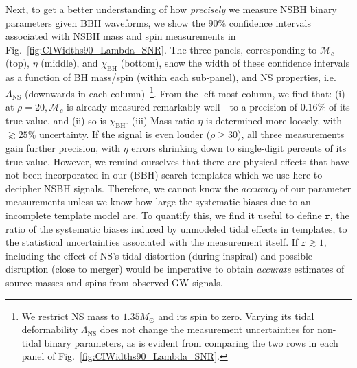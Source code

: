 \documentclass[aps,prd,amsmath,floats,floatfix, twocolumn,
superscriptaddress,nofootinbib,showpacs]{revtex4-1}
\newcommand{\lambdans}{\Lambda_\mathrm{NS}}
\newcommand{\chibh}{\chi_\mathrm{BH}}
\newcommand{\mchirp}{\mathcal{M}_c}
\newcommand{\arr}{\mathtt{r}}
\begin{document}
Next, to get a better understanding of how {\it precisely} we measure NSBH
binary parameters given BBH waveforms, we show the $90\%$ confidence intervals
associated with NSBH mass and spin measurements in Fig.~\ref{fig:CIWidths90_Lambda_SNR}.
The three panels, corresponding to $\mchirp$ (top), $\eta$ (middle), and $\chibh$
(bottom), show the width of these confidence intervals as a function of BH
mass/spin (within each sub-panel), and NS properties, i.e. $\lambdans$
(downwards in each column)~\footnote{We restrict NS mass to $1.35M_\odot$ and
its spin to zero. Varying its tidal deformability $\lambdans$ does not change
the measurement uncertainties for non-tidal binary parameters, as is evident
from comparing the two rows in each panel of Fig.~\ref{fig:CIWidths90_Lambda_SNR}.}.
% 
From the left-most column, we find that: (i) at $\rho=20, \mchirp$ is already
measured remarkably well - to a precision of $0.16\%$ of its true value, and
(ii) so is $\chibh$. (iii) Mass ratio $\eta$ is determined more loosely,
with $\gtrsim 25\%$ uncertainty. If the signal is even louder ($\rho\geq 30$),
all three measurements gain further precision, with $\eta$ errors shrinking down
to single-digit percents of its true value.
% 
However, we remind ourselves that there are physical effects that have not been
incorporated in our (BBH) search templates which we use here to decipher NSBH
signals. Therefore, we cannot know the {\it accuracy} of our parameter
measurements unless we know how large the systematic biases due to an
incomplete template model are. To quantify this, we find it useful to define
$\arr$, the ratio of the systematic biases induced by unmodeled tidal effects in
templates, to the statistical uncertainties associated with the measurement
itself. If $\arr\gtrsim 1$, including the effect of NS's tidal distortion
(during inspiral) and possible disruption (close to merger) would be imperative
to obtain {\it accurate} estimates of source masses and spins from observed GW
signals.
\end{document}
